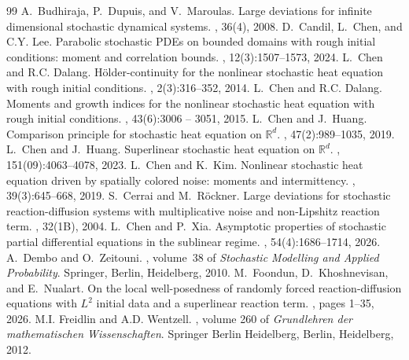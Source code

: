 \documentclass[10pt,a4paper]{amsart}
\numberwithin{equation}{section}
\newcommand{\R}{\mathbb{R}}
\begin{document}
\begin{thebibliography}{99}
 A.~Budhiraja, P.~Dupuis, and V.~Maroulas. \newblock Large deviations for infinite dimensional stochastic dynamical systems. , 36(4), 2008.
 D.~Candil, L.~Chen, and C.Y. Lee. \newblock Parabolic stochastic {PDE}s on bounded domains with rough initial conditions: moment and correlation bounds. , 12(3):1507--1573, 2024.
 L.~Chen and R.C. Dalang. \newblock H{\"o}lder-continuity for the nonlinear stochastic heat equation with rough initial conditions. , 2(3):316--352, 2014.
 L.~Chen and R.C. Dalang. \newblock Moments and growth indices for the nonlinear stochastic heat equation with rough initial conditions. , 43(6):3006 -- 3051, 2015.
 L.~Chen and J.~Huang. \newblock Comparison principle for stochastic heat equation on {$\R^d$}. , 47(2):989--1035, 2019.
 L.~Chen and J.~Huang. \newblock Superlinear stochastic heat equation on {$\R^d$}. , 151(09):4063--4078, 2023.
 L.~Chen and K.~Kim. \newblock Nonlinear stochastic heat equation driven by spatially colored noise: moments and intermittency. , 39(3):645--668, 2019.
 S.~Cerrai and M.~Röckner. \newblock Large deviations for stochastic reaction-diffusion systems with multiplicative noise and non-{Lipshitz} reaction term. , 32(1B), 2004.
 L.~Chen and P.~Xia. \newblock Asymptotic properties of stochastic partial differential equations in the sublinear regime. , 54(4):1686--1714, 2026.
 A.~Dembo and O.~Zeitouni. , volume~38 of {\em Stochastic {Modelling} and {Applied} {Probability}}. \newblock Springer, Berlin, Heidelberg, 2010.
 M.~Foondun, D.~Khoshnevisan, and E.~Nualart. \newblock On the local well-posedness of randomly forced reaction-diffusion equations with {$L^2$} initial data and a superlinear reaction term. , pages 1--35, 2026.
 M.I. Freidlin and A.D. Wentzell. , volume 260 of {\em Grundlehren der mathematischen {Wissenschaften}}. \newblock Springer Berlin Heidelberg, Berlin, Heidelberg, 2012.

\end{thebibliography}
\end{document}
